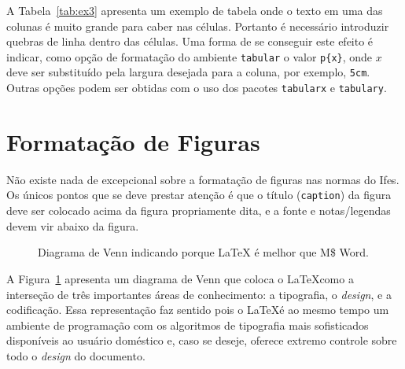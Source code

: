 \documentclass[times,english,brazil,oneside]{ifes8}
\begin{document}
A Tabela~\ref{tab:ex3} apresenta um exemplo de tabela onde o texto em
uma das colunas é muito grande para caber nas células. Portanto é
necessário introduzir quebras de linha dentro das células. Uma forma
de se conseguir este efeito é indicar, como opção de formatação do
ambiente \texttt{tabular} o valor \verb!p{x}!, onde $x$ deve ser
substituído pela largura desejada para a coluna, por exemplo,
\texttt{5cm}. Outras opções podem ser obtidas com o uso dos pacotes
\texttt{tabularx} e \texttt{tabulary}.



\section{Formatação de Figuras}
\label{sec:format-figuras}

Não existe nada de excepcional sobre a formatação de figuras nas
normas do Ifes. Os únicos pontos que se deve prestar atenção é que o
título (\texttt{caption}) da figura deve ser colocado acima da figura
propriamente dita, e a fonte e notas/legendas devem vir abaixo da
figura.

\begin{figure}[h]
  \centering
  \caption{Diagrama de Venn indicando porque \LaTeX{} é melhor que M\$
    Word.}
  \label{fig:ex1}
\end{figure}

A Figura~\ref{fig:ex1} apresenta um diagrama de Venn que coloca o
\LaTeX como a interseção de três importantes áreas de conhecimento: a
tipografia, o \emph{design}, e a codificação. Essa representação faz
sentido pois o \LaTeX é ao mesmo tempo um ambiente de programação com
os algoritmos de tipografia mais sofisticados disponíveis ao usuário
doméstico e, caso se deseje, oferece extremo controle sobre todo o
\emph{design} do documento.
\end{document}
